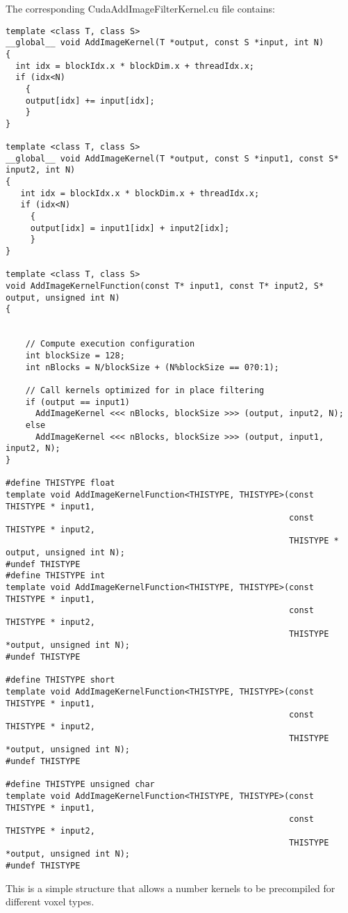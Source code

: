 \documentclass{InsightArticle}
\begin{document}
The corresponding CudaAddImageFilterKernel.cu file contains:
{\small
\begin{verbatim}
template <class T, class S>
__global__ void AddImageKernel(T *output, const S *input, int N)
{
  int idx = blockIdx.x * blockDim.x + threadIdx.x;
  if (idx<N)
    {
    output[idx] += input[idx];
    }
}

template <class T, class S>
__global__ void AddImageKernel(T *output, const S *input1, const S* input2, int N)
{
   int idx = blockIdx.x * blockDim.x + threadIdx.x;
   if (idx<N)
     {
     output[idx] = input1[idx] + input2[idx];
     }
}

template <class T, class S>
void AddImageKernelFunction(const T* input1, const T* input2, S* output, unsigned int N)
{


    // Compute execution configuration
    int blockSize = 128;
    int nBlocks = N/blockSize + (N%blockSize == 0?0:1);

    // Call kernels optimized for in place filtering
    if (output == input1)
      AddImageKernel <<< nBlocks, blockSize >>> (output, input2, N);
    else
      AddImageKernel <<< nBlocks, blockSize >>> (output, input1, input2, N);
}

#define THISTYPE float
template void AddImageKernelFunction<THISTYPE, THISTYPE>(const THISTYPE * input1,
                                                         const THISTYPE * input2,
                                                         THISTYPE * output, unsigned int N);
#undef THISTYPE
#define THISTYPE int
template void AddImageKernelFunction<THISTYPE, THISTYPE>(const THISTYPE * input1,
                                                         const THISTYPE * input2,
                                                         THISTYPE *output, unsigned int N);
#undef THISTYPE

#define THISTYPE short
template void AddImageKernelFunction<THISTYPE, THISTYPE>(const THISTYPE * input1,
                                                         const THISTYPE * input2,
                                                         THISTYPE *output, unsigned int N);
#undef THISTYPE

#define THISTYPE unsigned char
template void AddImageKernelFunction<THISTYPE, THISTYPE>(const THISTYPE * input1,
                                                         const THISTYPE * input2,
                                                         THISTYPE *output, unsigned int N);
#undef THISTYPE

\end{verbatim}
}
This is a simple structure that allows a number kernels to be precompiled for different voxel types.
\end{document}
